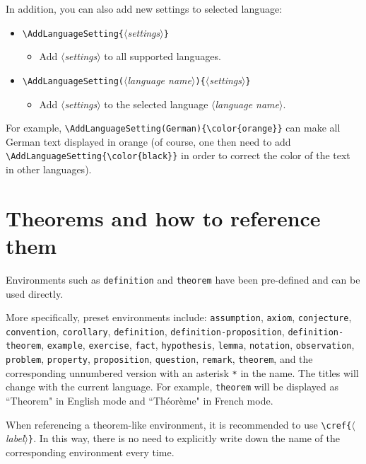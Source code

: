 \documentclass[allowbf]{beaulivre}
\providecommand{\meta}[1]{$\langle${\normalfont\itshape#1}$\rangle$}
\begin{document}
\medskip
In addition, you can also add new settings to selected language:
\begin{itemize}
    \item \lstinline|\AddLanguageSetting{|\meta{settings}\lstinline|}|
    \begin{itemize}
        \item Add \meta{settings} to all supported languages.
    \end{itemize}
    \item \lstinline|\AddLanguageSetting(|\meta{language name}\lstinline|){|\meta{settings}\lstinline|}|
    \begin{itemize}
        \item Add \meta{settings} to the selected language \meta{language name}.
    \end{itemize}
\end{itemize}
For example, \lstinline|\AddLanguageSetting(German){\color{orange}}| can make all German text displayed in orange (of course, one then need to add \lstinline|\AddLanguageSetting{\color{black}}| in order to correct the color of the text in other languages).


\section{Theorems and how to reference them}

Environments such as \texttt{definition} and \texttt{theorem} have been pre-defined and can be used directly. 

More specifically, preset environments include: 
\texttt{assumption}, \texttt{axiom}, \texttt{conjecture}, \texttt{convention}, \texttt{corollary}, \texttt{definition}, \texttt{definition-proposition}, \texttt{definition-theorem}, \texttt{example}, \texttt{exercise}, \texttt{fact}, \texttt{hypothesis}, \texttt{lemma}, \texttt{notation}, \texttt{observation}, \texttt{problem}, \texttt{property}, \texttt{proposition}, \texttt{question}, \texttt{remark}, \texttt{theorem}, and the corresponding unnumbered version with an asterisk \lstinline|*| in the name. The titles will change with the current language. For example, \texttt{theorem} will be displayed as ``Theorem" in English mode and ``Théorème" in French mode.

\medskip
When referencing a theorem-like environment, it is recommended to use \lstinline|\cref{|\meta{label}\texttt{\}}. In this way, there is no need to explicitly write down the name of the corresponding environment every time.
\end{document}

